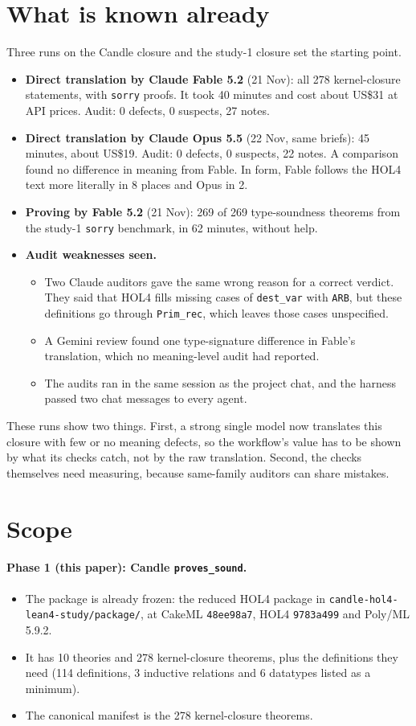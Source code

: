 \documentclass[11pt,a4paper]{article}
\newcommand{\code}[1]{\texttt{#1}}
\begin{document}
\section{What is known already}
Three runs on the Candle closure and the study-1 closure set the starting point.
\begin{itemize}
\item \textbf{Direct translation by Claude Fable 5.2} (21 Nov): all 278 kernel-closure statements, with \code{sorry} proofs. It took 40 minutes and cost about US\$31 at API prices. Audit: 0 defects, 0 suspects, 27 notes.
\item \textbf{Direct translation by Claude Opus 5.5} (22 Nov, same briefs): 45 minutes, about US\$19. Audit: 0 defects, 0 suspects, 22 notes. A comparison found no difference in meaning from Fable. In form, Fable follows the HOL4 text more literally in 8 places and Opus in 2.
\item \textbf{Proving by Fable 5.2} (21 Nov): 269 of 269 type-soundness theorems from the study-1 \code{sorry} benchmark, in 62 minutes, without help.
\item \textbf{Audit weaknesses seen.}
  \begin{itemize}
  \item Two Claude auditors gave the same wrong reason for a correct verdict. They said that HOL4 fills missing cases of \code{dest\_var} with \code{ARB}, but these definitions go through \code{Prim\_rec}, which leaves those cases unspecified.
  \item A Gemini review found one type-signature difference in Fable's translation, which no meaning-level audit had reported.
  \item The audits ran in the same session as the project chat, and the harness passed two chat messages to every agent.
  \end{itemize}
\end{itemize}
These runs show two things. First, a strong single model now translates this closure with few or no meaning defects, so the workflow's value has to be shown by what its checks catch, not by the raw translation. Second, the checks themselves need measuring, because same-family auditors can share mistakes.

\section{Scope}
\paragraph{Phase 1 (this paper): Candle \code{proves\_sound}.}
\begin{itemize}
\item The package is already frozen: the reduced HOL4 package in \code{candle-hol4-lean4-study/package/}, at CakeML \code{48ee98a7}, HOL4 \code{9783a499} and Poly/ML 5.9.2.
\item It has 10 theories and 278 kernel-closure theorems, plus the definitions they need (114 definitions, 3 inductive relations and 6 datatypes listed as a minimum).
\item The canonical manifest is the 278 kernel-closure theorems.
\end{itemize}
\end{document}
